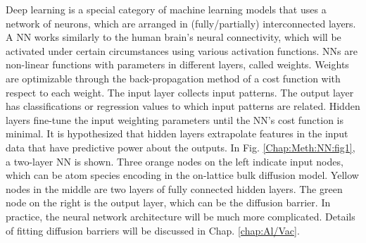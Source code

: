 Deep learning is a special category of machine learning models that uses a network of neurons, which are arranged in (fully/partially) interconnected layers. A \ac{NN} works similarly to the human brain’s neural connectivity, which will be activated under certain circumstances using various activation functions. \ac{NN}s are non-linear functions with parameters in different layers, called weights. Weights are optimizable through the back-propagation method of a cost function with respect to each weight. The input layer collects input patterns. The output layer has classifications or regression values to which input patterns are related. Hidden layers fine-tune the input weighting parameters until the \ac{NN}’s cost function is minimal. It is hypothesized that hidden layers extrapolate features in the input data that have predictive power about the outputs. In Fig. \ref{Chap:Meth:NN:fig1}, a two-layer \ac{NN} is shown. Three orange nodes on the left indicate input nodes, which can be atom species encoding in the on-lattice bulk diffusion model. Yellow nodes in the middle are two layers of fully connected hidden layers. The green node on the right is the output layer, which can be the diffusion barrier. In practice, the neural network architecture will be much more complicated. Details of fitting diffusion barriers will be discussed in Chap. \ref{chap:Al/Vac}.